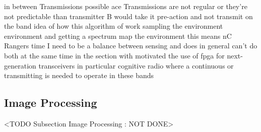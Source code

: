 in between Transmissions possible ace Transmissions are not regular or they're not predictable than transmitter B would take it pre-action and not transmit on the band idea of how this algorithm of work sampling the environment environment and getting a spectrum map the environment this means nC Rangers time I need to be a balance between sensing and does in general can't do both at the same time in the section with motivated the use of fpga for next-generation transceivers in particular cognitive radio where a continuous or transmitting is needed to operate in these bands

\subsection{Image Processing}
	<TODO Subsection Image Processing : NOT DONE>

